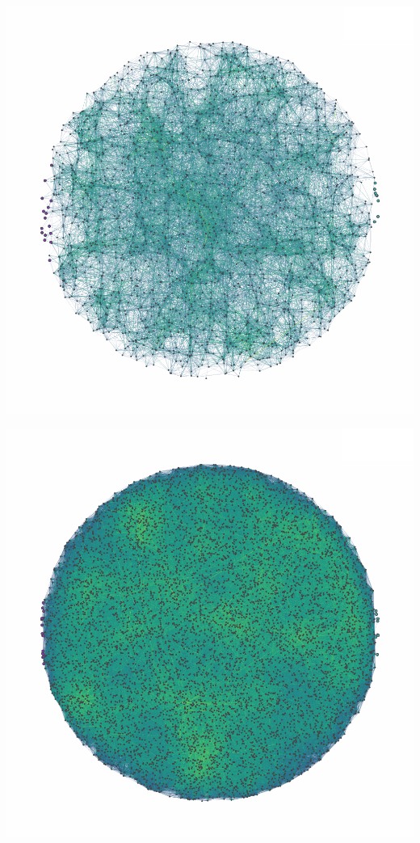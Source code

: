 \documentclass{article}
\begin{document}
\begin{multicols}{2}
\begin{center}
	\includegraphics[scale=0.15]{figs/evolution-large}
	
	\includegraphics[scale=0.19]{figs/evolution_huge}
	

\end{center}
\end{multicols}
\end{document}
